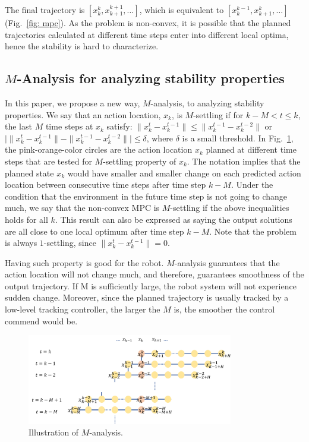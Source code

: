 \documentclass[letterpaper, 10 pt, conference]{ieeeconf}  %
\begin{document}
The final trajectory is $[x_k^k,x_{k+1}^{k+1},\ldots]$, which is equivalent to $[x_{k}^{k-1},x_{k+1}^{k},\ldots]$ (Fig.~\ref{fig: mpc}). As the problem is non-convex, it is possible that the planned trajectories calculated at different time steps enter into different local optima, hence the stability is hard to characterize. 

\subsection{$M$-Analysis for analyzing stability properties}
In this paper, we propose a new way, $M$-analysis, to analyzing stability properties.
We say that an action location, $x_{k}$, is $M$-settling if for $k-M< t\leq k$, the last $M$ time steps at $x_{k}$ satisfy: $\|x_{k}^t-x_k^{t-1}\|\leq \|x_k^{t-1}-x_k^{t-2}\|$ or $\bigl|\|x_{k}^t-x_k^{t-1}\|-\|x_k^{t-1}-x_k^{t-2}\|\bigr|\leq \delta$, where $\delta$ is a small threshold. In Fig.~\ref{fig:m-stable}, the pink-orange-color circles are the action location $x_{k}$ planned at different time steps that are  tested for $M$-settling property of $x_{k}$. The notation implies that the planned state $x_k$ would have smaller and smaller change on each predicted action location between consecutive time steps after time step $k-M$. Under the condition that the environment in the future time step is not going to change much, we say that the non-convex MPC is $M$-settling if the above inequalities holds for all $k$. This result can also be expressed as saying the output solutions are all close to one local optimum after time step $k-M$. Note that the problem is always $1$-settling, since $\|x_{k}^t-x_k^{t-1}\|=0$.

Having such property is good for the robot. $M$-analysis guarantees that the action location will not change much, and therefore, guarantees smoothness of the output trajectory. If M is sufficiently large, the robot system will not experience sudden change. Moreover, since the planned trajectory is usually tracked by a low-level tracking controller, the larger the $M$ is, the smoother the control commend would be.

\begin{figure}[t]
\begin{center}
\includegraphics[width=9cm]{src/Mstable.png}
\caption{Illustration of $M$-analysis.}
\label{fig:m-stable}
\end{center}
\end{figure}
\end{document}
